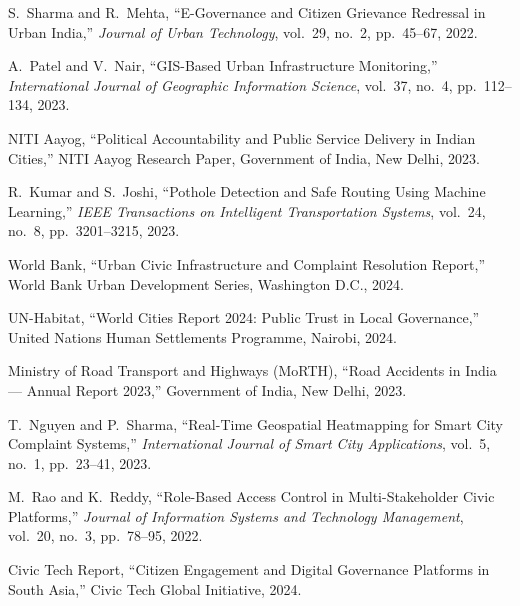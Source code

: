 \documentclass[12pt,a4paper]{report}
\begin{document}
\begin{enumerate}[label={[\arabic*]}, leftmargin=2.5em, itemsep=6pt]

\item S.~Sharma and R.~Mehta, ``E-Governance and Citizen Grievance
Redressal in Urban India,'' \textit{Journal of Urban Technology},
vol.~29, no.~2, pp.~45--67, 2022.

\item A.~Patel and V.~Nair, ``GIS-Based Urban Infrastructure Monitoring,''
\textit{International Journal of Geographic Information Science},
vol.~37, no.~4, pp.~112--134, 2023.

\item NITI Aayog, ``Political Accountability and Public Service Delivery
in Indian Cities,'' NITI Aayog Research Paper, Government of India,
New Delhi, 2023.

\item R.~Kumar and S.~Joshi, ``Pothole Detection and Safe Routing Using
Machine Learning,'' \textit{IEEE Transactions on Intelligent
Transportation Systems}, vol.~24, no.~8, pp.~3201--3215, 2023.

\item World Bank, ``Urban Civic Infrastructure and Complaint Resolution
Report,'' World Bank Urban Development Series, Washington D.C., 2024.

\item UN-Habitat, ``World Cities Report 2024: Public Trust in Local
Governance,'' United Nations Human Settlements Programme, Nairobi, 2024.

\item Ministry of Road Transport and Highways (MoRTH), ``Road Accidents
in India --- Annual Report 2023,'' Government of India, New Delhi, 2023.

\item T.~Nguyen and P.~Sharma, ``Real-Time Geospatial Heatmapping for
Smart City Complaint Systems,'' \textit{International Journal of Smart
City Applications}, vol.~5, no.~1, pp.~23--41, 2023.

\item M.~Rao and K.~Reddy, ``Role-Based Access Control in
Multi-Stakeholder Civic Platforms,'' \textit{Journal of Information
Systems and Technology Management}, vol.~20, no.~3, pp.~78--95, 2022.

\item Civic Tech Report, ``Citizen Engagement and Digital Governance
Platforms in South Asia,'' Civic Tech Global Initiative, 2024.


\end{enumerate}
\end{document}
